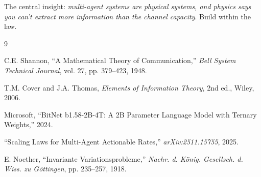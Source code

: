\documentclass[11pt,a4paper]{article}
\begin{document}
The central insight: \emph{multi-agent systems are physical systems, and physics says you can't extract more information than the channel capacity}. Build within the law.

\begin{thebibliography}{9}

C.E. Shannon, ``A Mathematical Theory of Communication,'' \emph{Bell System Technical Journal}, vol. 27, pp. 379--423, 1948.

T.M. Cover and J.A. Thomas, \emph{Elements of Information Theory}, 2nd ed., Wiley, 2006.

Microsoft, ``BitNet b1.58-2B-4T: A 2B Parameter Language Model with Ternary Weights,'' 2024.

``Scaling Laws for Multi-Agent Actionable Rates,'' \emph{arXiv:2511.15755}, 2025.

E. Noether, ``Invariante Variationsprobleme,'' \emph{Nachr. d. K\"onig. Gesellsch. d. Wiss. zu G\"ottingen}, pp. 235--257, 1918.

\end{thebibliography}
\end{document}
